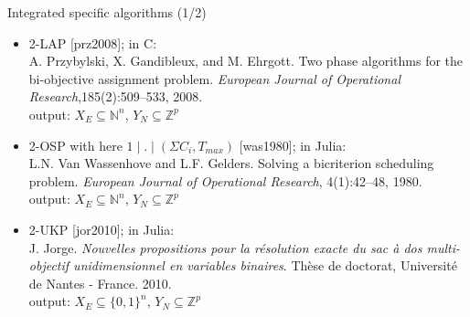\documentclass[10pt,xcolor=dvipsnames]{beamer}
\newcommand{\mN}{\mathbb{N}}
\newcommand{\mB}{\{0,1\}}
\newcommand{\grey}{\textcolor{black!25}}
\newcommand{\Z}{\mathbb{Z}}
\begin{document}
%
% 
\begin{frame}{Integrated specific algorithms (1/2)}

{\small
\begin{itemize}
\item 2-LAP [prz2008]; in C:\vspace{1mm}\\
         {\tiny A. Przybylski, X. Gandibleux, and M. Ehrgott. Two phase algorithms for the bi-objective assignment problem.
         \textit{European Journal of Operational Research},185(2):509--533, 2008.\\}
         output: $X_E \subseteq \mN^n$, $Y_N \subseteq \Z^p$
         \medskip

\item {2-OSP with here $1\mid . \mid (\Sigma C_i,T_{max})$  [was1980]; in Julia:\vspace{1mm}\\
         {\tiny L.N. Van Wassenhove and L.F. Gelders. Solving a bicriterion scheduling problem. 
         \textit{European Journal of Operational Research}, 4(1):42--48, 1980.\\}
         output: $X_E \subseteq \mN^n$, $Y_N \subseteq \Z^p$
         }
         \medskip
         
\item \grey{ 2-UKP [jor2010]; in Julia:\vspace{1mm}\\
         {\tiny J. Jorge. \textit{Nouvelles propositions pour la résolution exacte du sac à dos multi-objectif unidimensionnel en variables binaires}.
         Th\`ese de doctorat, Université de Nantes - France. 2010.\\}
         output: $X_E \subseteq \mB^n$, $Y_N \subseteq \Z^p$
         }
         \medskip
                  

\end{itemize}}
\end{frame}
\end{document}
